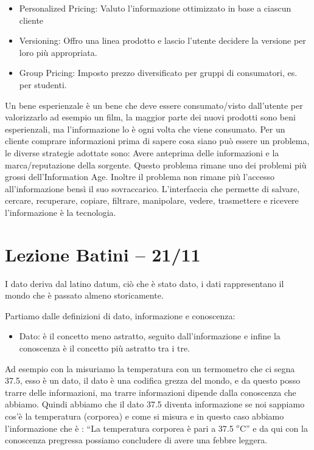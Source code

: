 \documentclass[a4page, 11pt]{article}
\begin{document}
\begin{itemize}
	 
	\item
	Personalized Pricing: Valuto l'informazione ottimizzato in base a
	ciascun cliente
	\item
	Versioning: Offro una linea prodotto e lascio l'utente decidere la
	versione per loro più appropriata.
	\item
	Group Pricing: Imposto prezzo diversificato per gruppi di consumatori,
	es. per studenti.
\end{itemize}

Un bene esperienzale è un bene che deve essere consumato/visto
dall'utente per valorizzarlo ad esempio un film, la maggior parte dei
nuovi prodotti sono beni esperienzali, ma l'informazione lo è ogni volta
che viene consumato. Per un cliente comprare informazioni prima di
sapere cosa siano può essere un problema, le diverse strategie adottate
sono: Avere anteprima delle informazioni e la marca/reputazione della
sorgente. Questo problema rimane uno dei problemi più grossi
dell'Information Age. Inoltre il problema non rimane più l'accesso
all'informazione bensì il suo sovraccarico. L'interfaccia che permette
di salvare, cercare, recuperare, copiare, filtrare, manipolare, vedere,
trasmettere e ricevere l'informazione è la tecnologia.

\section*{Lezione Batini -- 21/11}

I dato deriva dal latino datum, ciò che è stato dato, i dati
rappresentano il mondo che è passato almeno storicamente.

Partiamo dalle definizioni di dato, informazione e conoscenza:

\begin{itemize}
	 
	\item
	Dato: è il concetto meno astratto, seguito dall'informazione e infine
	la conoscenza è il concetto più astratto tra i tre. 
\end{itemize}

Ad esempio con la misuriamo la temperatura con un termometro che ci
segna 37.5, esso è un dato, il dato è una codifica grezza del mondo, e
da questo posso trarre delle informazioni, ma trarre informazioni
dipende dalla conoscenza che abbiamo. Quindi abbiamo che il dato 37.5
diventa informazione se noi sappiamo cos'è la temperatura (corporea) e
come si misura e in questo caso abbiamo l'informazione che è : ``La
temperatura corporea è pari a 37.5 $^o$C'' e da qui con la conoscenza
pregressa possiamo concludere di avere una febbre leggera.
\end{document}
